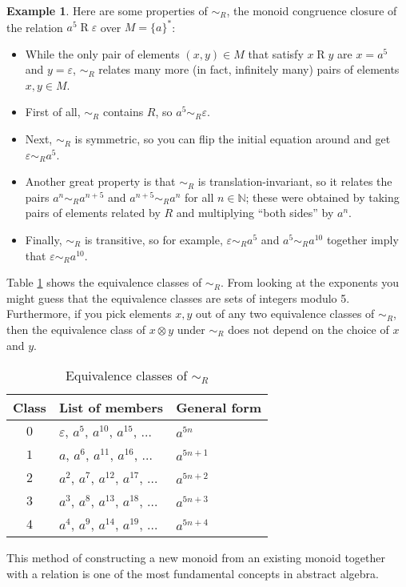 \documentclass[headsepline,bibliography=totoc]{scrreport}
\theoremstyle{definition}
\newtheorem{example}{Example}[chapter]
\theoremstyle{definition}
\theoremstyle{definition}
\begin{document}
\begin{example}
Here are some properties of $\sim_R$, the monoid congruence closure of the relation $a^5\mathrel{R}\varepsilon$ over $M=\{a\}^*$:

\begin{itemize}
\item While the only pair of elements $(x, y)\in M$ that satisfy $x\mathrel{R}y$ are $x=a^5$ and $y=\varepsilon$, $\sim_R$ relates many more (in fact, infinitely many) pairs of elements $x, y\in M$.
\item First of all, $\sim_R$ contains $R$, so $a^5\sim_R\varepsilon$.
\item Next, $\sim_R$ is symmetric, so you can flip the initial equation around and get $\varepsilon\sim_R a^5$.
\item Another great property is that $\sim_R$ is translation-invariant, so it relates the pairs $a^n\sim_R a^{n+5}$ and $a^{n+5}\sim_R a^n$ for all $n\in\mathbb{N}$; these were obtained by taking pairs of elements related by $R$ and multiplying ``both sides'' by $a^n$.
\item Finally, $\sim_R$ is transitive, so for example, $\varepsilon\sim_R a^5$ and $a^5\sim_R a^{10}$ together imply that $\varepsilon\sim_R a^{10}$.
\end{itemize}

Table \ref{classesmod5} shows the equivalence classes of $\sim_R$. From looking at the exponents you might guess that the equivalence classes are sets of integers modulo 5. Furthermore, if you pick elements $x, y$ out of any two equivalence classes of $\sim_R$, then the equivalence class of $x\otimes y$ under $\sim_R$ does not depend on the choice of $x$ and $y$.

\begin{table}\caption{Equivalence classes of $\sim_R$}\label{classesmod5}
\begin{center}
{\renewcommand{\arraystretch}{1.5}
\begin{tabular}{c|l|l}
Class&List of members&General form\\
\hline
\hline
$0$&$\varepsilon$, $a^5$, $a^{10}$, $a^{15}$, $\ldots$&$a^{5n}$\\
$1$&$a$, $a^6$, $a^{11}$, $a^{16}$, $\ldots$&$a^{5n+1}$\\
$2$&$a^2$, $a^7$, $a^{12}$, $a^{17}$, $\ldots$&$a^{5n+2}$\\
$3$&$a^3$, $a^8$, $a^{13}$, $a^{18}$, $\ldots$&$a^{5n+3}$\\
$4$&$a^4$, $a^9$, $a^{14}$, $a^{19}$, $\ldots$&$a^{5n+4}$\\
\end{tabular}
}
\end{center}
\end{table}
\end{example}
This method of constructing a new monoid from an existing monoid together with a relation is one of the most fundamental concepts in abstract algebra.
\end{document}
